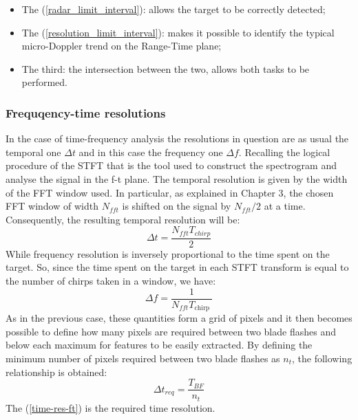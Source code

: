 \begin{itemize}
    \item The (\ref{radar_limit_interval}): allows the target to be correctly detected;
    
    \item The (\ref{resolution_limit_interval}): makes it possible to identify the typical micro-Doppler trend on the Range-Time plane;
         
    \item The third: the intersection between the two, allows both tasks to be performed.

\end{itemize}

\subsubsection{Frequqency-time resolutions}
In the case of time-frequency analysis the resolutions in question are as usual the temporal one $\Delta t$ and in this case the frequency one $\Delta f$. Recalling the logical procedure of the STFT that is the tool used to construct the spectrogram and analyse the signal in the f-t plane. The temporal resolution is given by the width of the FFT window used. In particular, as explained in Chapter 3, the chosen FFT window of width $N_{fft}$ is shifted on the signal by $N_{fft}/2$ at a time. Consequently, the resulting temporal resolution will be:
\begin{equation}
\Delta t=\frac{N_{fft} T_{chirp}}{2}
\label{temporal-ft-res}
\end{equation}
While frequency resolution is inversely proportional to the time spent on the target. So, since the time spent on the target in each STFT transform is equal to the number of chirps taken in a window, we have:
\begin{equation}
\Delta f=\frac{1}{N_{fft} T_{\text {chirp }}}
\label{freqeuncy-ft-res}
\end{equation}
As in the previous case, these quantities form a grid of pixels and it then becomes possible to define how many pixels are required between two blade flashes and below each maximum for features to be easily extracted. By defining the minimum number of pixels required between two blade flashes as $n_{t}$, the following relationship is obtained:
\begin{equation}
\Delta t_{req}=\frac{T_{BF}}{n_{t}} 
\label{time-res-ft}
\end{equation}
The (\ref{time-res-ft}) is the required time resolution.
